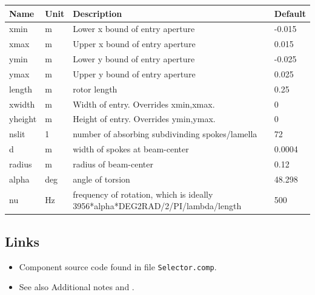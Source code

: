 \begin{longtable}{p{}p{}p{}p{}}
\toprule
\textbf{Name} & \textbf{Unit} & \textbf{Description} & \textbf{Default} \\
\midrule
\endhead
xmin & m & Lower x bound of entry aperture & -0.015 \\
xmax & m & Upper x bound of entry aperture & 0.015 \\
ymin & m & Lower y bound of entry aperture & -0.025 \\
ymax & m & Upper y bound of entry aperture & 0.025 \\
length & m & rotor length & 0.25 \\
xwidth & m & Width of entry. Overrides xmin,xmax. & 0 \\
yheight & m & Height of entry. Overrides ymin,ymax. & 0 \\
nslit & 1 & number of absorbing subdivinding spokes/lamella & 72 \\
d & m & width of spokes at beam-center & 0.0004 \\
radius & m & radius of beam-center & 0.12 \\
alpha & deg & angle of torsion & 48.298 \\
nu & Hz & frequency of rotation, which is ideally 3956*alpha*DEG2RAD/2/PI/lambda/length & 500 \\
\bottomrule
\end{longtable}

\subsection*{Links}
\begin{itemize}
  \item Component source code found in file \texttt{Selector.comp}.
  \item See also Additional notes  and .
\end{itemize}
